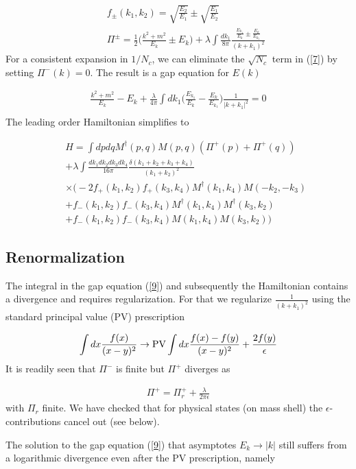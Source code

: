 \documentclass[showpacs,twocolumn,aps,preprintnumbers,letterpaper]{revtex4}
\newcommand{\be}{\begin{equation}}
\newcommand{\ee}{\end{equation}}
\def\be{\begin{eqnarray}}
\def\ee{\end{eqnarray}}
\begin{document}
\be
\label{8}
&&f_{\pm}(k_1,k_2)=\sqrt{\frac{E_2}{E_1}}\pm \sqrt{\frac{E_1}{E_2}}\nonumber\\
&&\Pi^{\pm}=\frac{1}{2}\bigg(\frac{k^2+m^2}{E_k}\pm E_k\bigg)+\lambda \int\frac{dk_1}{8\pi}\frac{\frac{E_{k_1}}{E_k}\pm \frac{E_{k}}{E_{k_1}}}{(k+k_1)^2}
\ee
For a consistent expansion in $1/N_c$, we can eliminate the $\sqrt{N_c}$ term in (\ref{7}) by setting 
$\Pi^{-}(k)=0$. The result is a gap equation for  $E(k)$

\be
\label{9}
\frac{k^2+m^2}{E_k}-E_k+\frac{\lambda}{4\pi}\int dk_1\bigg(\frac{E_{k_1}}{E_{k}}-\frac{E_{k}}{E_{k_1}}\bigg)\frac{1}{|k+k_1|^2}=0\nonumber \\ 
\ee
The leading order Hamiltonian simplifies to

\be
\label{10}
&&H=\int dpdqM^{\dagger}(p,q)M(p,q)(\Pi^{+}(p)+\Pi^{+}(q))\nonumber \\
&&+\lambda \int \frac{dk_1dk_2dk_3 dk_4}{16\pi}\frac{\delta(k_1+k_2+k_3+k_4)}{(k_1+k_2)^2}\nonumber \\
&& \times \bigg(-2f_+(k_1,k_2)f_+(k_3,k_4)M^{\dagger}(k_1,k_4)M(-k_2,-k_3)\nonumber \\
&&+f_-(k_1,k_2)f_-(k_3,k_4)M^{\dagger}(k_1,k_4)M^{\dagger}(k_3,k_2)\nonumber \\
&&+ f_-(k_1,k_2)f_-(k_3,k_4)M(k_1,k_4)M(k_3,k_2)\bigg)
\ee



\subsection{Renormalization}

The integral in the gap equation (\ref{9}) and subsequently  the Hamiltonian contains a divergence and requires
 regularization.   For that we regularize  $\frac{1}{(k+k_1)^2}$ using the standard principal value (PV) prescription

\be
\label{R1}
\int dx \frac{f(x)}{(x-y)^2}\rightarrow {\rm PV}\int dx \frac{f(x)-f(y)}{(x-y)^2}+\frac{2f(y)}{\epsilon}
\ee
It is readily seen that $\Pi^-$ is finite but $\Pi^+$ diverges as

\be
\label{R2}
\Pi^{+}=\Pi^{+}_r+\frac{\lambda}{2\pi \epsilon}
\ee
with $\Pi_r$ finite.  We have checked that for physical states (on mass shell) the $\epsilon$-contributions
cancel out (see below).

The solution to the gap equation (\ref{9}) that asymptotes $E_k\rightarrow |k|$ still suffers from a logarithmic divergence
even after the PV prescription, namely
\end{document}

